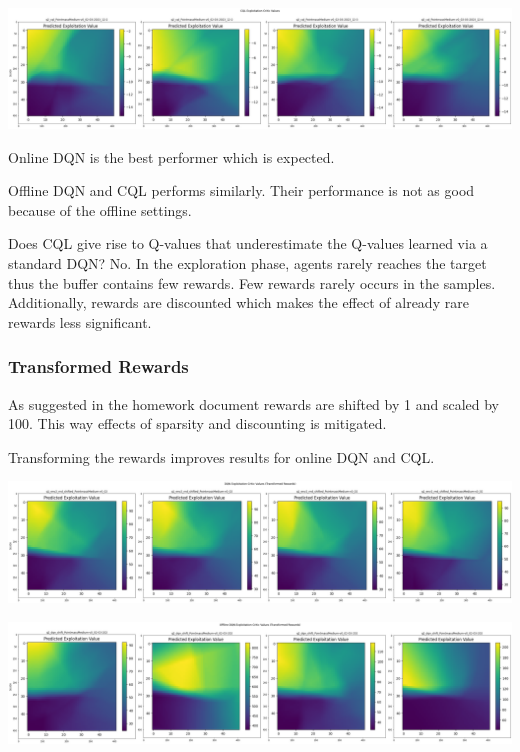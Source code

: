 \documentclass[11pt]{article}
\begin{document}
    \hspace*{-0.6in}
    \includegraphics[scale=0.20]{p2/q2-p1-explt-cql}

    Online DQN is the best performer which is expected.

    Offline DQN and CQL performs similarly.
    Their performance is not as good because of the offline settings.

    Does CQL give rise to Q-values that underestimate the Q-values learned via a standard DQN?
    No.
    In the exploration phase, agents rarely reaches the target thus the buffer contains few rewards.
    Few rewards rarely occurs in the samples.
    Additionally, rewards are discounted which makes the effect of already rare rewards less significant.

    \subsubsection{Transformed Rewards}

    As suggested in the homework document rewards are shifted by 1 and scaled by 100.
    This way effects of sparsity and discounting is mitigated.

    Transforming the rewards improves results for online DQN and CQL.

    \hspace*{-0.6in}
    \includegraphics[scale=0.20]{p2/q2-p1-explt-dqn-trans}

    \hspace*{-0.6in}
    \includegraphics[scale=0.20]{p2/q2-p1-explt-off-dqn-trans}
\end{document}

